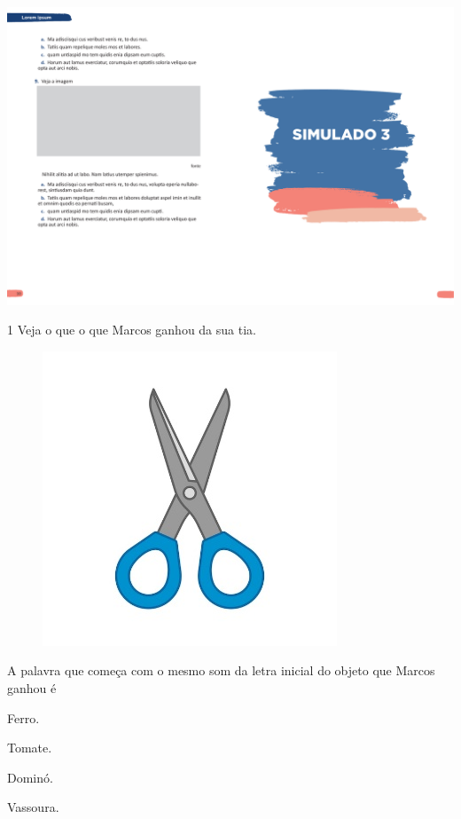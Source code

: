 \vspace*{-3.4cm}
\hspace*{-3.7cm}\includegraphics[scale=1]{../watermarks/3simulado5ano.pdf}

\num{1} Veja o que o que Marcos ganhou da sua tia.

\begin{figure}[htpb!]
\centering
\includegraphics[width=.4\textwidth]{media/image163.jpeg}
\end{figure}


A palavra que começa com o mesmo som da letra inicial do objeto que
Marcos ganhou é

\begin{escolha}
\item Ferro.

\item Tomate.

\item Dominó.

\item Vassoura.
\end{escolha}

